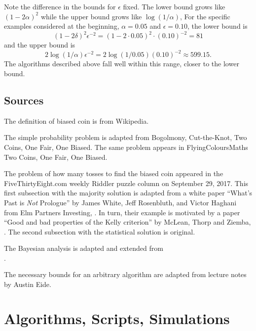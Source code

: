\documentclass[12pt]{article}
\begin{document}
Note the difference in the bounds for \( \epsilon \) fixed.  The lower
bound grows like \( (1-2\alpha)^2 \) while the upper bound grows like \(
\log(1/\alpha) \), For the specific examples considered at the
beginning, \( \alpha = 0.05 \) and \( \epsilon = 0.10 \), the lower
bound is
\[
    (1 - 2\delta)^2 \epsilon^{-2} = (1- 2 \cdot 0.05)^2 \cdot (0.10)^{-2}
    = 81
\] and the upper bound is
\[
    2 \log(1/\alpha) \epsilon^{-2} = 2 \log(1/0.05) (0.10)^{-2} \approx
    599.15.
\] The algorithms described above fall well within this range, closer to
the lower bound.

\subsection*{Sources}

The definition of biased coin is from Wikipedia.

The simple probability problem is adapted from 
{Bogolmony, Cut-the-Knot, Two Coins, One Fair, One Biased}.  The same
problem appears in 
{FlyingColoursMaths Two Coins, One Fair, One Biased}.

The problem of how many tosses to find the biased coin appeared in the
FiveThirtyEight.com weekly Riddler puzzle column on September 29, 2017.
This first subsection with the majority solution is adapted from a white
paper ``What's Past is \emph{Not} Prologue'' by James White, Jeff
Rosenbluth, and Victor Haghani from Elm Partners Investing,
\cite{white17}. In turn, their example is motivated by a paper ``Good
and bad properties of the Kelly criterion'' by McLean, Thorp and
Ziemba,
\cite{mclean17}.  The second subsection with the statistical solution is
original.

The Bayesian analysis is adapted and extended from \\
.

The necessary bounds for an arbitrary algorithm are adapted from lecture
notes by Austin Eide.

\nocite{white17}
\nocite{maclean10}

\hr

\section*{Algorithms, Scripts, Simulations}
\end{document}
